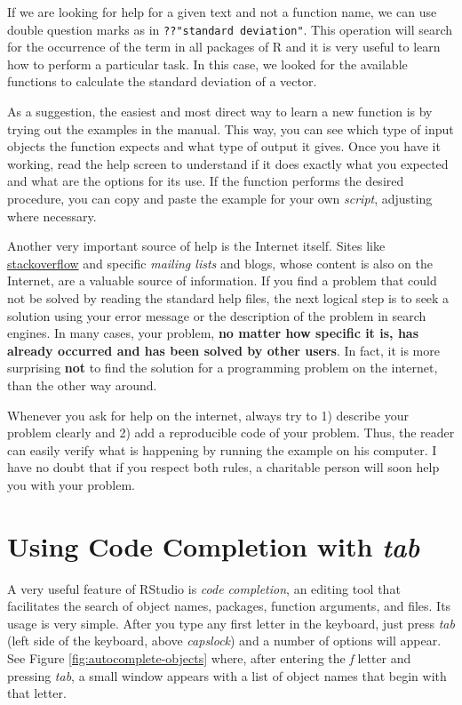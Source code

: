 \documentclass[
  12pt,
]{book}
\newenvironment{rmdcaution}
{\begin{cautionblock}
		
	} {\end{cautionblock}}
\begin{document}
If we are looking for help for a given text and not a function name, we can use double question marks as in \texttt{??"standard\ deviation"}. This operation will search for the occurrence of the term in all packages of R and it is very useful to learn how to perform a particular task. In this case, we looked for the available functions to calculate the standard deviation of a vector.

As a suggestion, the easiest and most direct way to learn a new function is by trying out the examples in the manual. This way, you can see which type of input objects the function expects and what type of output it gives. Once you have it working, read the help screen to understand if it does exactly what you expected and what are the options for its use. If the function performs the desired procedure, you can copy and paste the example for your own \emph{script}, adjusting where necessary.

Another very important source of help is the Internet itself. Sites like \href{http://stackoverflow.com/}{stackoverflow} and specific \emph{mailing lists} and blogs, whose content is also on the Internet, are a valuable source of information. If you find a problem that could not be solved by reading the standard help files, the next logical step is to seek a solution using your error message or the description of the problem in search engines. In many cases, your problem, \textbf{no matter how specific it is, has already occurred and has been solved by other users}. In fact, it is more surprising \textbf{not} to find the solution for a programming problem on the internet, than the other way around.

\begin{rmdcaution}
Whenever you ask for help on the internet, always try to 1) describe
your problem clearly and 2) add a reproducible code of your problem.
Thus, the reader can easily verify what is happening by running the
example on his computer. I have no doubt that if you respect both rules,
a charitable person will soon help you with your problem.
\end{rmdcaution}

\hypertarget{autocomplete}{%
\section{\texorpdfstring{Using Code Completion with \emph{tab}}{Using Code Completion with tab}}\label{autocomplete}}

A very useful feature of RStudio is \emph{code completion}, an editing tool that facilitates the search of object names, packages, function arguments, and files. Its usage is very simple. After you type any first letter in the keyboard, just press \emph{tab} (left side of the keyboard, above \emph{capslock}) and a number of options will appear. See Figure \ref{fig:autocomplete-objects} where, after entering the \emph{f} letter and pressing \emph{tab}, a small window appears with a list of object names that begin with that letter. 
\end{document}
